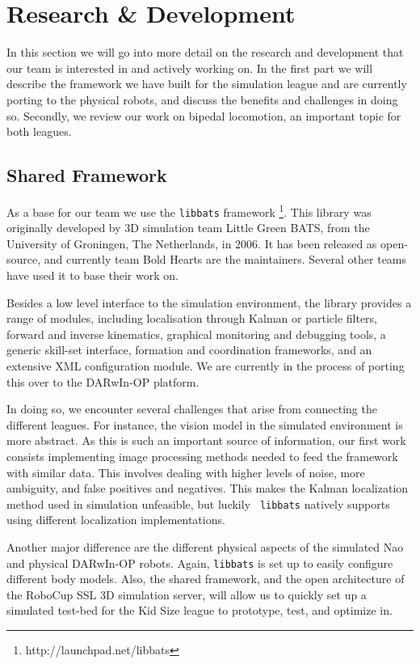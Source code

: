 \documentclass{llncs}
\begin{document}
\section{Research \& Development}
\label{sec:research}

In this section we will go into more detail on the research and
development that our team is interested in and actively working
on. In the first part we will describe the framework we have built for
the simulation league and are currently porting to the physical
robots, and discuss the benefits and challenges in doing so. Secondly,
we review our work on bipedal locomotion, an important topic for both
leagues.

\subsection{Shared Framework}
\label{sec:framework}

As a base for our team we use the {\tt libbats} framework
\footnote{http://launchpad.net/libbats}. This library was originally
developed by 3D simulation team Little Green BATS, from the University
of Groningen, The Netherlands, in 2006. It has been released as
open-source, and currently team Bold Hearts are the maintainers.
Several other teams have used it to base their work on.

Besides a low level interface to the simulation environment, the
library provides a range of modules, including localisation through
Kalman or particle filters, forward and inverse kinematics, graphical
monitoring and debugging tools, a generic skill-set interface,
formation and coordination frameworks, and an extensive XML
configuration module. We are currently in the process of porting this
over to the DARwIn-OP platform.

In doing so, we encounter several challenges that arise from
connecting the different leagues. For instance, the vision model in
the simulated environment is more abstract. As this is such an
important source of information, our first work consists implementing
image processing methods needed to feed the framework with similar
data. This involves dealing with higher levels of noise, more
ambiguity, and false positives and negatives. This makes the Kalman
localization method used in simulation unfeasible, but luckily {\tt
  libbats} natively supports using different localization
implementations.

Another major difference are the different physical aspects of the
simulated Nao and physical DARwIn-OP robots. Again, {\tt libbats} is
set up to easily configure different body models. Also, the shared
framework, and the open architecture of the RoboCup SSL 3D simulation
server, will allow us to quickly set up a simulated test-bed for the
Kid Size league to prototype, test, and optimize in.
\end{document}
